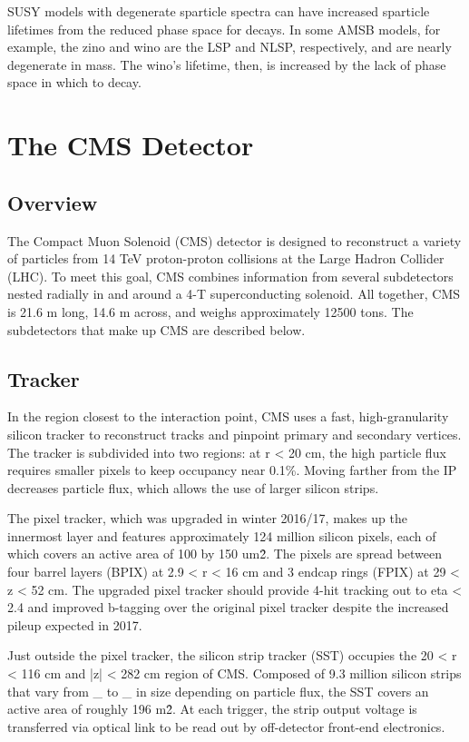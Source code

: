 \documentclass[12pt]{article}
\begin{document}
    SUSY models with degenerate sparticle spectra can have increased sparticle lifetimes from the reduced phase space for decays. In some AMSB models, for example, the zino and wino are the LSP and NLSP, respectively, and are nearly degenerate in mass. The wino's lifetime, then, is increased by the lack of phase space in which to decay.

\section{The CMS Detector}
\subsection{Overview}
          The Compact Muon Solenoid (CMS) detector is designed to reconstruct a variety of particles from 14 TeV proton-proton collisions at the Large Hadron Collider (LHC). To meet this goal, CMS combines information from several subdetectors nested radially in and around a 4-T superconducting solenoid. All together, CMS is 21.6 m long, 14.6 m across, and weighs approximately 12500 tons. The subdetectors that make up CMS are described below.

\subsection{Tracker}
        In the region closest to the interaction point, CMS uses a fast, high-granularity silicon tracker to reconstruct tracks and pinpoint primary and secondary vertices. The tracker is subdivided into two regions: at r < 20 cm, the high particle flux requires smaller pixels to keep occupancy near 0.1\%. Moving farther from the IP decreases particle flux, which allows the use of larger silicon strips.

        The pixel tracker, which was upgraded in winter 2016/17, makes up the innermost layer and features approximately 124 million silicon pixels, each of which covers an active area of 100 by 150 um\^2. The pixels are spread between four barrel layers (BPIX) at 2.9 < r < 16 cm and 3 endcap rings (FPIX) at 29 < z < 52 cm. The upgraded pixel tracker should provide 4-hit tracking out to eta < 2.4 and improved b-tagging over the original pixel tracker despite the increased pileup expected in 2017.
        
        Just outside the pixel tracker, the silicon strip tracker (SST) occupies the 20 < r < 116 cm and |z| < 282 cm region of CMS. Composed of 9.3 million silicon strips that vary from \_ to \_ in size depending on particle flux, the SST covers an active area of roughly 196 m\^2. At each trigger, the strip output voltage is transferred via optical link to be read out by off-detector front-end electronics.
\end{document}
